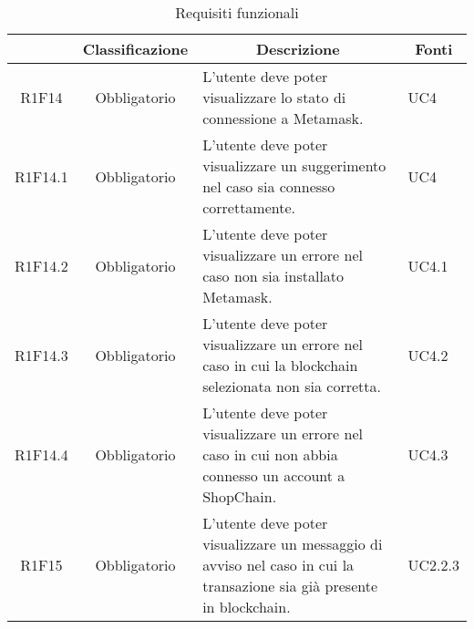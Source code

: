 \begin{table}[H]
    \centering
    \renewcommand{\arraystretch}{1.8}
    \begin{tabular}{c | c | p{6cm} | p{4.1cm}}
        \rowcolor[HTML]{125E28}
        \multicolumn{1}{c}{\color[HTML]{FFFFFF} \textbf{Codice}}          &
        \multicolumn{1}{c}{\color[HTML]{FFFFFF} \textbf{Classificazione}} &
        \multicolumn{1}{c}{\color[HTML]{FFFFFF} \textbf{Descrizione}}     &
        \multicolumn{1}{c}{\color[HTML]{FFFFFF} \textbf{Fonti}}                                                                                                                                                                   \\
        \hline
        R1F14                                                             & Obbligatorio & L'utente deve poter visualizzare lo stato di connessione a Metamask\glo{}.                                       & UC4                      \\
        R1F14.1                                                           & Obbligatorio & L'utente deve poter visualizzare un suggerimento nel caso sia connesso correttamente.                      & UC4                      \\
        R1F14.2                                                           & Obbligatorio & L'utente deve poter visualizzare un errore nel caso non sia installato Metamask\glo{}.                                             & UC4.1   \\
        R1F14.3                                                           & Obbligatorio & L'utente deve poter visualizzare un errore nel caso in cui la blockchain selezionata non sia corretta.                       & UC4.2   \\
        R1F14.4                                                           & Obbligatorio & L'utente deve poter visualizzare un errore nel caso in cui non abbia connesso un account a ShopChain.                        & UC4.3   \\
        R1F15                                                             & Obbligatorio & L'utente deve poter visualizzare un messaggio di avviso nel caso in cui la transazione sia già presente in blockchain\glo{}. & UC2.2.3 \\
    \end{tabular}
    \caption{Requisiti funzionali}
\end{table}

